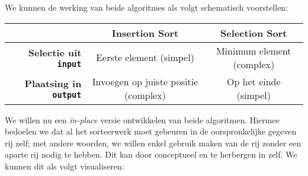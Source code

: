 We kunnen de werking van beide algoritmes als volgt schematisch voorstellen:
\begin{center}
  \begin{tabular}{r||c|c}
    & {\bf Insertion Sort} & {\bf Selection Sort} \\
    \hline \hline
    {\bfseries Selectie uit {\tt\bfseries input}} & Eerste element (simpel) & Minimum element (complex) \\
    \hline
    {\bfseries Plaatsing in {\tt\bfseries output}} & Invoegen op juiste positie (complex) & Op het einde (simpel) \\
  \end{tabular}
\end{center}

We willen nu een \emph{in-place} versie ontwikkelen van beide algoritmen. Hiermee bedoelen we
dat al het sorteerwerk moet gebeuren in de oorspronkelijke gegeven rij zelf; met andere woorden,
we willen enkel gebruik maken van de rij  zonder een aparte rij
 nodig te hebben.
Dit kan door conceptueel  en  te herbergen in
 zelf. We kunnen dit als volgt visualiseren:

